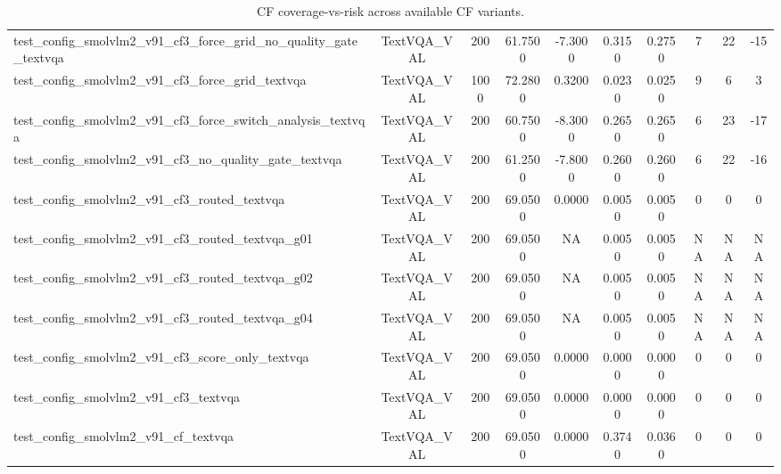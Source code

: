 \begin{table}[t]
\begin{tabular}{lccccccccc}
test_config_smolvlm2_v91_cf3_force_grid_no_quality_gate_textvqa & TextVQA_VAL & 200 & 61.7500 & -7.3000 & 0.3150 & 0.2750 & 7 & 22 & -15 \\
test_config_smolvlm2_v91_cf3_force_grid_textvqa & TextVQA_VAL & 1000 & 72.2800 & 0.3200 & 0.0230 & 0.0250 & 9 & 6 & 3 \\
test_config_smolvlm2_v91_cf3_force_switch_analysis_textvqa & TextVQA_VAL & 200 & 60.7500 & -8.3000 & 0.2650 & 0.2650 & 6 & 23 & -17 \\
test_config_smolvlm2_v91_cf3_no_quality_gate_textvqa & TextVQA_VAL & 200 & 61.2500 & -7.8000 & 0.2600 & 0.2600 & 6 & 22 & -16 \\
test_config_smolvlm2_v91_cf3_routed_textvqa & TextVQA_VAL & 200 & 69.0500 & 0.0000 & 0.0050 & 0.0050 & 0 & 0 & 0 \\
test_config_smolvlm2_v91_cf3_routed_textvqa_g01 & TextVQA_VAL & 200 & 69.0500 & NA & 0.0050 & 0.0050 & NA & NA & NA \\
test_config_smolvlm2_v91_cf3_routed_textvqa_g02 & TextVQA_VAL & 200 & 69.0500 & NA & 0.0050 & 0.0050 & NA & NA & NA \\
test_config_smolvlm2_v91_cf3_routed_textvqa_g04 & TextVQA_VAL & 200 & 69.0500 & NA & 0.0050 & 0.0050 & NA & NA & NA \\
test_config_smolvlm2_v91_cf3_score_only_textvqa & TextVQA_VAL & 200 & 69.0500 & 0.0000 & 0.0000 & 0.0000 & 0 & 0 & 0 \\
test_config_smolvlm2_v91_cf3_textvqa & TextVQA_VAL & 200 & 69.0500 & 0.0000 & 0.0000 & 0.0000 & 0 & 0 & 0 \\
test_config_smolvlm2_v91_cf_textvqa & TextVQA_VAL & 200 & 69.0500 & 0.0000 & 0.3740 & 0.0360 & 0 & 0 & 0 \\
\bottomrule
\end{tabular}
\caption{CF coverage-vs-risk across available CF variants.}
\label{tab:cf_coverage_risk}
\end{table}
